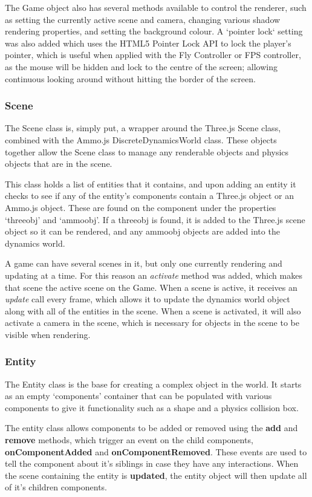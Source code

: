 	The Game object also has several methods available to control the renderer, such as setting the currently active scene and camera, changing various shadow rendering properties, and setting the background colour. A `pointer lock` setting was also added which uses the HTML5 Pointer Lock API to lock the player's pointer, which is useful when applied with the Fly Controller or FPS controller, as the mouse will be hidden and lock to the centre of the screen; allowing continuous looking around without hitting the border of the screen.


	\subsubsection{Scene}
	The Scene class is, simply put, a wrapper around the Three.js Scene class, combined with the Ammo.js DiscreteDynamicsWorld class. These objects together allow the Scene class to manage any renderable objects and physics objects that are in the scene.

	This class holds a list of entities that it contains, and upon adding an entity it checks to see if any of the entity's components contain a Three.js object or an Ammo.js object. These are found on the component under the properties `threeobj' and `ammoobj'. If a threeobj is found, it is added to the Three.js scene object so it can be rendered, and any ammoobj objects are added into the dynamics world.

	A game can have several scenes in it, but only one currently rendering and updating at a time. For this reason an \emph{activate} method was added, which makes that scene the active scene on the Game. When a scene is active, it receives an \emph{update} call every frame, which allows it to update the dynamics world object along with all of the entities in the scene. When a scene is activated, it will also activate a camera in the scene, which is necessary for objects in the scene to be visible when rendering.

	\subsubsection{Entity}
	The Entity class is the base for creating a complex object in the world. It starts as an empty `components' container that can be populated with various components to give it functionality such as a shape and a physics collision box. 

	The entity class allows components to be added or removed using the \textbf{add} and \textbf{remove} methods, which trigger an event on the child components, \textbf{onComponentAdded} and \textbf{onComponentRemoved}. These events are used to tell the component about it's siblings in case they have any interactions. When the scene containing the entity is \textbf{updated}, the entity object will then update all of it's children components.

